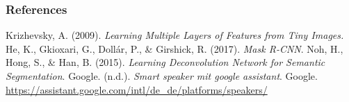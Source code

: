 \documentclass[11pt,compress,t,notes=noshow, xcolor=table]{beamer}
\begin{document}
\begin{vbframe}
\frametitle{References}
\footnotesize{
\begin{thebibliography}{99}
Krizhevsky, A. (2009). \textit{Learning Multiple Layers of Features from Tiny Images.}
He, K., Gkioxari, G., Dollár, P., \& Girshick, R. (2017). \textit{Mask R-CNN}.
Noh, H., Hong, S., \& Han, B. (2015). \textit{Learning Deconvolution Network for Semantic Segmentation}.
Google. (n.d.). \textit{Smart speaker mit google assistant}. Google. \url{https://assistant.google.com/intl/de_de/platforms/speakers/}
\end{thebibliography}
}
\end{vbframe}


\endlecture
\end{document}
